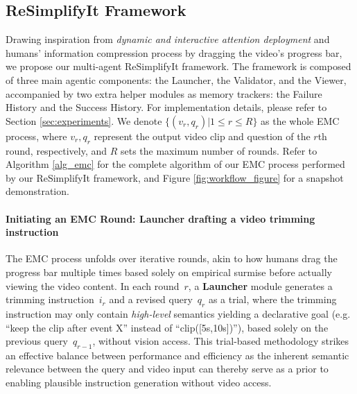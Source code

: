 
\subsection{ReSimplifyIt Framework}
Drawing inspiration from \textit{dynamic and interactive attention deployment} \citep{FITNO1, GS2.0NO2} and humans' information compression process by dragging the video's progress bar, we propose our multi-agent ReSimplifyIt framework. The framework is composed of three main agentic components: the Launcher, the Validator, and the Viewer, accompanied by two extra helper modules as memory trackers: the Failure History and the Success History. For implementation details, please refer to Section \ref{sec:experiments}. We denote $\{(v_r, q_r)|1 \leq r \leq R\}$ as the whole EMC process, where $v_r, q_r$ represent the output video clip and question of the $r$th round, respectively, and $R$ sets the maximum number of rounds. Refer to Algorithm \ref{alg_emc} for the complete algorithm of our EMC process performed by our ReSimplifyIt framework, and Figure \ref{fig:workflow_figure} for a snapshot demonstration. 

\paragraph{Initiating an EMC Round: Launcher drafting a video trimming instruction}

The EMC process unfolds over iterative rounds, akin to how humans drag the progress bar multiple times based solely on empirical surmise before actually viewing the video content. In each round~$r$, a \textbf{Launcher} module generates a trimming instruction~$i_r$ and a revised query~$q_r$ as a trial, where the trimming instruction may only contain \textit{high-level} semantics yielding a declarative goal (e.g. ``keep the clip after event X'' instead of ``clip([5s,10s])''), based solely on the previous query~$q_{r-1}$, without vision access. This trial-based methodology strikes an effective balance between performance and efficiency as the inherent semantic relevance between the query and video input can thereby serve as a prior to enabling plausible instruction generation without video access.

